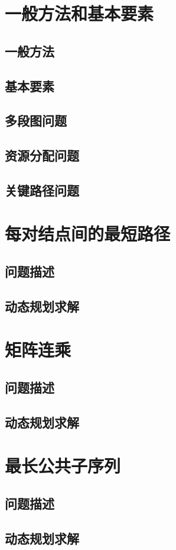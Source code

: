 \section{一般方法和基本要素}
\subsection*{一般方法}
\subsection*{基本要素}
\subsection*{多段图问题}
\subsection*{资源分配问题}
\subsection*{关键路径问题}
\section{每对结点间的最短路径}
\subsection*{问题描述}
\subsection*{动态规划求解}
\section{矩阵连乘}
\subsection*{问题描述}
\subsection*{动态规划求解}
\section{最长公共子序列}
\subsection*{问题描述}
\subsection*{动态规划求解}

